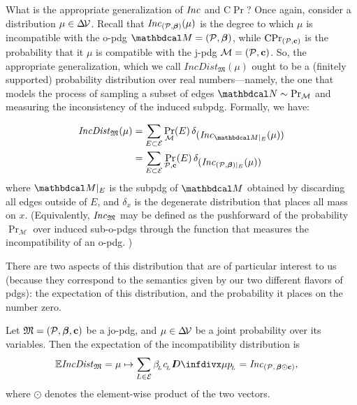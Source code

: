 \documentclass{article}
\newcommand\IncD{\mathit{IncDist}}
\begin{document}
What is the appropriate generalization of $\mathit{Inc}$ and $\mathrm{C}\!\Pr$?
Once again, consider a distribution $\mu \in \Delta\!\mathcal V$.
Recall that $\mathit{Inc}_{(\mathcal P, \boldsymbol\beta)}(\mu)$ is the degree to which $\mu$ is incompatible with the o-pdg $\dg M = (\mathcal P, \bbeta)$, while $\mathrm{C}\!\Pr_{(\mathcal P, \mathbf{c})}$ is the probability that it $\mu$ is compatible with the j-pdg $\mathcal M = (\mathcal P, \mathbf{c})$. 
So, the appropriate generalization, which we call $\IncD_{\mathfrak M}(\mu)$ ought to be a (finitely supported) probability distribution over real numbers---namely, the one that models the process of sampling a subset of edges $\dg N \sim \Pr_{\mathcal M}$ and measuring the inconsistency of the induced subpdg.  
Formally, we have:

\begin{align*}
    \IncD_{\mathfrak M} 
        (\mu) &= \sum_{E \subset \Ed} \Pr_{\mathcal M}(E)\, \delta_{%
            \textstyle(\Inc_{\dg M |_E}(\mu))}
            \\&= \sum_{E \subset \Ed} \Pr_{\mathcal P, \mat c}(E) \,\delta_{%
                \textstyle(\Inc_{(\mathcal P, \bbeta) |_E}(\mu))}
\end{align*}
where $\dg M |_E$ is the subpdg of $\dg M$ obtained by discarding all edges outside of $E$, and $\delta_{x}$ is the degenerate distribution that places all mass on $x$. 
{\color{gray}(Equivalently, $\mathit{Inc}_{\mathfrak M}$ may be defined as the pushforward of the probability $\Pr_{\mathcal M}$ over induced sub-o-pdgs through the function that measures the incompatibility of an o-pdg. )}

There are two aspects of this distribution that are of particular interest to us (because they correspond to the semantics given by our two different flavors of pdgs): the expectation of this distribution, and the probability it places on the number zero. 

\begin{prop}
    Let $\mathfrak M = (\mathcal P, \boldsymbol\beta, \mathbf{c})$ be a jo-pdg, and $\mu \in \Delta\!\mathcal V$ be a joint probability over its variables. 
    Then the expectation of the incompatibility distribution is
    \begin{align*}
        \Ex\!\IncD_{\mathfrak M} 
            &= \mu\mapsto \sum_{L \in \mathcal E} \beta\ssub L c \ssub L \kldiv\mu{p\ssub L} 
            = \Inc_{(\mathcal P,\, \bbeta \odot \mat c)},
    \end{align*}
    \vspace{-1ex}
    where $\odot$ denotes the element-wise product of the two vectors.
\end{prop}
\end{document}

